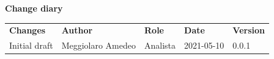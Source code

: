 \documentclass[a4paper]{article}
\begin{document}
\begin{center}
    \textbf{\Large Change diary}\\
    \vspace{10px}
    \begin{table}[h!]
        \centering
        \renewcommand{\arraystretch}{1.8}
        \begin{tabular}{p{150px} p{90px} p{80px} p{60px} p{45px}}
            \rowcolor{logo!70} \textbf{Changes}                          & \textbf{Author}   & \textbf{Role} & \textbf{Date} & \textbf{Version} \\
            Initial draft                                       & Meggiolaro Amedeo       & Analista       & 2021-05-10    & 0.0.1             \\
        \end{tabular}
    \end{table}
\end{center}





\appendix

\end{document}
